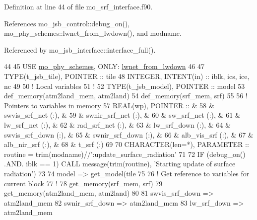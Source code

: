 Definition at line 44 of file mo\+\_\+srf\+\_\+interface.\+f90.



References mo\+\_\+jsb\+\_\+control\+::debug\+\_\+on(), mo\+\_\+phy\+\_\+schemes\+::lwnet\+\_\+from\+\_\+lwdown(), and modname.



Referenced by mo\+\_\+jsb\+\_\+interface\+::interface\+\_\+full().


\begin{DoxyCode}
44 
45     \textcolor{keywordtype}{USE }\hyperlink{namespacemo__phy__schemes}{mo\_phy\_schemes}\textcolor{keywordtype}{, ONLY}: \hyperlink{namespacemo__phy__schemes_ace9a64c869caa711065208594ef8114e}{lwnet\_from\_lwdown}
46 
47     \textcolor{keywordtype}{TYPE}(t\_jsb\_tile),  \textcolor{keywordtype}{POINTER}    :: tile
48     \textcolor{keywordtype}{INTEGER},           \textcolor{keywordtype}{INTENT(in)} :: iblk, ics, ice, nc
49 
50     \textcolor{comment}{! Local variables}
51     \textcolor{comment}{!}
52     \textcolor{keywordtype}{TYPE}(t\_jsb\_model), \textcolor{keywordtype}{POINTER}    :: model
53     def\_memory(atm2land\_mem, atm2land)
54     def\_memory(srf\_mem, srf)
55 
56     \textcolor{comment}{! Pointers to variables in memory}
57     \textcolor{keywordtype}{REAL(wp)}, \textcolor{keywordtype}{POINTER} ::      &
58       & swvis\_srf\_net    (:), &
59       & swnir\_srf\_net    (:), &
60       & sw\_srf\_net       (:), &
61       & lw\_srf\_net       (:), &
62       & rad\_srf\_net      (:), &
63       & lw\_srf\_down      (:), &
64       & swvis\_srf\_down   (:), &
65       & swnir\_srf\_down   (:), &
66       & alb\_vis\_srf      (:), &
67       & alb\_nir\_srf      (:), &
68       & t\_srf            (:)
69 
70     \textcolor{keywordtype}{CHARACTER(len=*)}, \textcolor{keywordtype}{PARAMETER} :: routine = trim(modname)//\textcolor{stringliteral}{':update\_surface\_radiation'}
71 
72     \textcolor{keywordflow}{IF} (debug\_on() .AND. iblk == 1) \textcolor{keyword}{CALL }message(trim(routine), \textcolor{stringliteral}{'Starting update of surface radiation'})
73 
74     model => get\_model(tile%
75 
76     \textcolor{comment}{! Get reference to variables for current block}
77     \textcolor{comment}{!}
78     get\_memory(srf\_mem, srf)
79     get\_memory(atm2land\_mem, atm2land)
80 
81     swvis\_srf\_down => atm2land\_mem     %
82     swnir\_srf\_down => atm2land\_mem     %
83     lw\_srf\_down    => atm2land\_mem     %

\end{DoxyCode}
